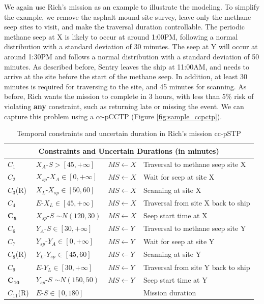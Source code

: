\documentclass[jair,twoside,11pt,theapa]{article}
\begin{document}
We again use Rich's mission as an example to illustrate the modeling. To
simplify the example, we remove the asphalt mound site survey, leave only the methane seep sites to visit, and make the traversal duration controllable. The
periodic methane seep at X is likely to occur at around 1:00PM, following a normal distribution with
a standard deviation of 30 minutes. The seep at Y will occur at around
1:30PM and follows a normal distribution with a standard deviation of 50
minutes. As described before, Sentry leaves the ship at 11:00AM, and needs to
arrive at the site before the start of the methane seep. In addition, at least 30
minutes is required for traversing to the site, and 45 minutes for scanning. As
before, Rich wants the mission to complete in 3 hours, with less than 5\% risk
of violating \textbf{any} constraint, such as returning late or missing the event. We
can capture this problem using a cc-pCCTP (Figure \ref{fig:sample_ccpctp}).

\begin{table}[ht!]	
	\centering
	\caption{Temporal constraints and uncertain duration in Rich's mission cc-pSTP}
	\begin{tabular}{| m{1.5cm} m{4.5cm}  m{1.7cm} m{6.0cm}|}		
		\hline
		\multicolumn{4}{|c|}{\textbf{Constraints and Uncertain Durations (in minutes)}} \\		
		\hline		
		$C_{1}$ & $X_A$-$S > [45,+\infty]$ & $MS \leftarrow X$ & Traversal to methane seep site X\\
		$C_{2}$ & $X_{sp}$-$X_A\in[0,+\infty]$ & $MS \leftarrow X$ & Wait for seep at site X \\
		$C_{3}$(R) & $X_L$-$X_{sp}\in[50,60]$ & $MS \leftarrow X$ & Scanning at site X \\ 
		$C_{4}$ & $E$-$X_L\in[45,+\infty]$ & $MS \leftarrow X$ & Traversal from site X back to ship \\
		$\mathbf{C_{5}}$ & $X_{sp}$-$S$ $\sim$$N(120,30)$ & $MS \leftarrow X$ & Seep start time at X \\
		$C_{6}$ & $Y_A$-$S\in[30,+\infty]$ & $MS \leftarrow Y$ & Traversal to methane seep site Y\\
		$C_{7}$ & $Y_{sp}$-$Y_A\in[0,+\infty]$ & $MS \leftarrow Y$ & Wait for seep at site Y \\
		$C_{8}$(R) & $Y_L$-$Y_{sp}\in[45,60]$ & $MS \leftarrow Y$ & Scanning at site Y \\ 
		$C_{9}$ & $E$-$Y_L\in[30,+\infty]$ & $MS \leftarrow Y$ & Traversal from site Y back to ship \\
		$\mathbf{C_{10}}$ & $Y_{sp}$-$S$ $\sim$$N(150,50)$ & $MS \leftarrow Y$ & Seep start time at Y \\  
		$C_{11}$(R) & $E$-$S\in[0,180]$ & & Mission duration \\  
		\hline
	\end{tabular}
	\label{table:ccpctp_constraints}
\end{table}
\end{document}
